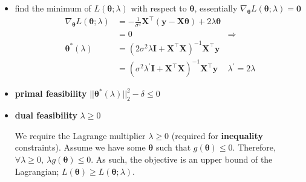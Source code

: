 \documentclass[a4paper, 12pt]{article}
\newcommand{\mat}[1]{\boldsymbol{#1}}
\begin{document}
                \begin{itemize}
                    \itemsep0em
                    \item find the minimum of $L(\mat{\theta}; \lambda)$ with respect to $\mat{\theta}$, essentially $\nabla_{\mat{\theta}}L(\mat{\theta}; \lambda) = \mat{0}$
                        \begin{align*}
                            \nabla_{\mat{\theta}}L(\mat{\theta}; \lambda) & = -\frac{1}{\sigma^2} \mat{X}^\top(\mat{y} - \mat{X}\mat{\theta}) + 2\lambda\mat{\theta} \\
                            & = 0 & \Rightarrow \\
                            \mat{\theta^*}(\lambda) & = (2 \sigma^2 \lambda \mat{I} + \mat{X}^\top\mat{X})^{-1}\mat{X}^\top\mat{y} \\
                            & = (\sigma^2 \lambda^\prime \mat{I} + \mat{X}^\top\mat{X})^{-1}\mat{X}^\top\mat{y} & \lambda^\prime = 2\lambda
                        \end{align*}
                    \item \textbf{primal feasibility} \hfill $|| \mat{\theta^*}(\lambda) ||_2^2 - \delta \leq 0$
                    \item \textbf{dual feasibility} \hfill $\lambda \geq 0$
                        \smallskip

                        We require the Lagrange multiplier $\lambda \geq 0$ (required for \textbf{inequality} constraints).
                        Assume we have some $\mat{\theta}$ such that $g(\mat{\theta}) \leq 0$.
                        Therefore, $\forall \lambda \geq 0,\ \lambda g(\mat{\theta}) \leq 0$.
                        As such, the objective is an upper bound of the Lagrangian; $L(\mat{\theta}) \geq L(\mat{\theta}; \lambda)$.
                        \medskip


\end{itemize}
\end{document}
